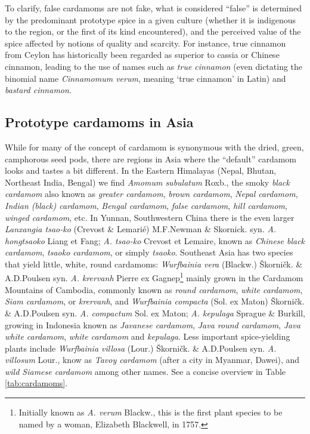 \documentclass[12pt]{article}
\begin{document}
To clarify, false cardamoms are not fake, what is considered ``false'' is determined by the predominant prototype spice in a given culture (whether it is indigenous to the region, or the first of its kind encountered), and the perceived value of the spice affected by notions of quality and scarcity. For instance, true cinnamon from Ceylon has historically been regarded as superior to cassia or Chinese cinnamon, leading to the use of names such as \textit{true cinnamon} (even dictating the binomial name \textit{Cinnamomum verum}, meaning `true cinnamon' in Latin) and \textit{bastard cinnamon}.

\subsection{Prototype cardamoms in Asia}

While for many of the concept of cardamom is synonymous with the dried, green, camphorous seed pods, there are regions in Asia where the ``default'' cardamom looks and tastes a bit different. In the Eastern Himalayas (Nepal, Bhutan, Northeast India, Bengal) we find \textit{Amomum subulatum} Roxb., the smoky \textit{black cardamom} also known as  \textit{greater cardamom}, \textit{brown cardamom}, \textit{Nepal cardamom}, \textit{Indian (black) cardamom}, \textit{Bengal cardamom}, \textit{false cardamom}, \textit{hill cardamom}, \textit{winged cardamom}, etc. In Yunnan, Southwestern China there is the even larger \textit{Lanxangia tsao-ko} (Crevost \& Lemarié) M.F.Newman \& Skornick. syn. \textit{A. hongtsaoko} Liang et Fang; \textit{A. tsao-ko} Crevost et Lemaire, known as \textit{Chinese black cardamom}, \textit{tsaoko cardamom}, or simply \textit{tsaoko}. Southeast Asia has two species that yield little, white, round cardamoms: \textit{Wurfbainia vera} (Blackw.) Škorničk. \& A.D.Poulsen syn. \textit{A. krervanh} Pierre ex Gagnep\footnote{Initially known as \textit{A. verum} Blackw., this is the first plant species to be named by a woman, Elizabeth Blackwell, in 1757.} mainly grown in the Cardamom Mountains of Cambodia, commonly known as \textit{round cardamom}, \textit{white cardamom}, \textit{Siam cardamom}, or \textit{krervanh}, and \textit{Wurfbainia compacta} (Sol. ex Maton) Škorničk. \& A.D.Poulsen syn. \textit{A. compactum} Sol. ex Maton; \textit{A. kepulaga} Sprague \& Burkill, growing in Indonesia known as \textit{Javanese cardamom}, \textit{Java round cardamom}, \textit{Java white cardamom}, \textit{white cardamom} and \textit{kepulaga}. Less important spice-yielding plants include \textit{Wurfbainia villosa} (Lour.) Škorničk. \& A.D.Poulsen syn. \textit{A. villosum} Lour., know as \textit{Tavoy cardamom} (after a city in Myanmar, Dawei), and \textit{wild Siamese cardamom} among other names. See a concise overview in Table \ref{tab:cardamoms}. 
\end{document}
